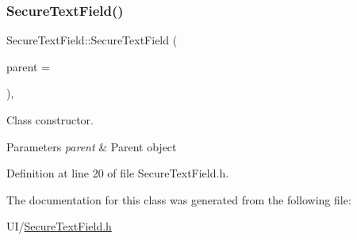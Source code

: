 \subsubsection{\texorpdfstring{Secure\+Text\+Field()}{SecureTextField()}}
{\footnotesize\ttfamily Secure\+Text\+Field\+::\+Secure\+Text\+Field (\begin{DoxyParamCaption}\item[{Q\+Object $\ast$}]{parent = {} }\end{DoxyParamCaption})\hspace{0.3cm}{\ttfamily [inline]}, {\ttfamily [explicit]}}



Class constructor. 


\begin{DoxyParams}{Parameters}
{\em parent} & Parent object \\
\hline
\end{DoxyParams}


Definition at line 20 of file Secure\+Text\+Field.\+h.



The documentation for this class was generated from the following file\+:\begin{DoxyCompactItemize}
\item 
U\+I/\hyperlink{_secure_text_field_8h}{Secure\+Text\+Field.\+h}\end{DoxyCompactItemize}

